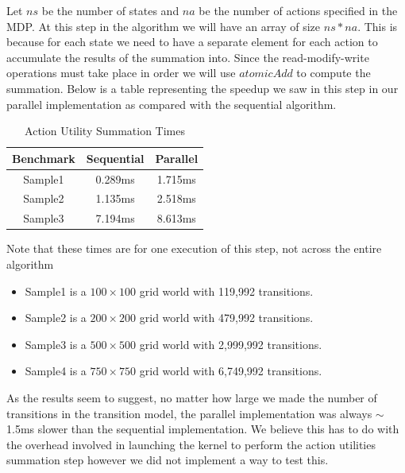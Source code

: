 \documentclass[letterpaper,twocolumn,10pt]{article}
\begin{document}
{%
%
%	

Let $ns$ be the number of states and $na$ be the number of actions specified in the MDP. At this step in the algorithm we will have an array of size $ns * na$. This is because for each state we need to have a separate element for each action to accumulate the results of the summation into. Since the read-modify-write operations must take place in order we will use $atomicAdd$ to compute the summation. Below is a table representing the speedup we saw in this step in our parallel implementation as compared with the sequential algorithm.

\begin{table}[h!]
	\centering
	\caption{Action Utility Summation Times}
	\label{tab:table1}
	\begin{tabular}{ccc}
		\toprule
		Benchmark & Sequential & Parallel\\
		\midrule
		Sample1 & 0.289ms & 1.715ms\\
		Sample2 & 1.135ms & 2.518ms\\
		Sample3 & 7.194ms & 8.613ms\\
		\bottomrule
	\end{tabular}
\end{table}

\scriptsize
Note that these times are for one execution of this step, not across the entire algorithm
\normalsize

\begin{itemize}
	\item Sample1 is a $100\times100$ grid world with 119,992 transitions.
	\item Sample2 is a $200\times200$ grid world with 479,992 transitions.
	\item Sample3 is a $500\times500$ grid world with 2,999,992 transitions.
	\item Sample4 is a $750\times750$ grid world with 6,749,992 transitions.
\end{itemize}

As the results seem to suggest, no matter how large we made the number of transitions in the transition model, the parallel implementation was always $\sim$1.5ms slower than the sequential implementation. We believe this has to do with the overhead involved in launching the kernel to perform the action utilities summation step however we did not implement a way to test this.

}
\end{document}
